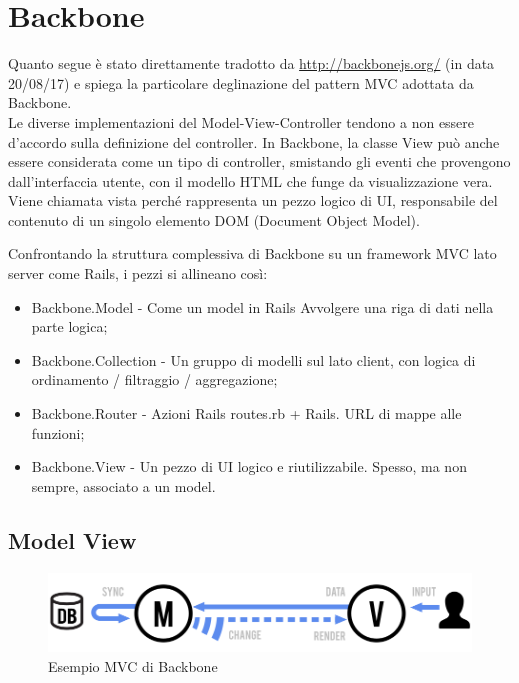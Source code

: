 \documentclass[../SpecificaTecnica.tex]{subfiles}
\begin{document}
	\section{Backbone}
Quanto segue è stato direttamente tradotto da \url{http://backbonejs.org/} (in data 20/08/17) e spiega la particolare deglinazione del pattern MVC adottata da Backbone.
\\
Le diverse implementazioni del Model-View-Controller tendono a non essere d'accordo sulla definizione del controller.
In Backbone, la classe View può anche essere considerata come un tipo di controller, smistando gli eventi che provengono dall'interfaccia utente, con il modello HTML che funge da visualizzazione vera.
Viene chiamata vista perché rappresenta un pezzo logico di UI, responsabile del contenuto di un singolo elemento DOM (Document Object Model).

Confrontando la struttura complessiva di Backbone su un framework MVC lato server come Rails, i pezzi si allineano così:
\begin{itemize}
 
\item Backbone.Model - Come un model in Rails Avvolgere una riga di dati nella parte logica;
\item Backbone.Collection - Un gruppo di modelli sul lato client, con logica di ordinamento / filtraggio / aggregazione;
\item Backbone.Router - Azioni Rails routes.rb + Rails. URL di mappe alle funzioni;
\item Backbone.View - Un pezzo di UI logico e riutilizzabile. Spesso, ma non sempre, associato a un model.\\
\end{itemize}
\subsection{Model View}
	\begin{figure}[H] \label{fig:MVC Backbone}
		\centering
		\includegraphics[scale=0.4]{Immagini/intro-model-view.png}
		\caption{Esempio MVC di Backbone}
	\end{figure}
\end{document}
